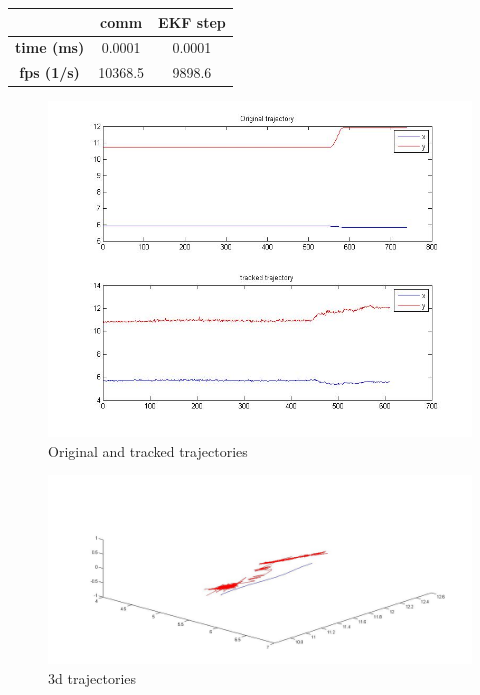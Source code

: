 		{
		\centering
			\begin{tabular}{|c|c|c|}
			\hline  					&  comm		&  EKF step	\\
			\hline  \textbf{time (ms)}	& 	0.0001	& 	0.0001	\\
			\hline  \textbf{fps (1/s)}	&  	10368.5	&   9898.6 	\\
			\hline 
			\end{tabular} 
		}
		\newline
	\begin{figure}[ph]
		\centering
		\includegraphics[width=0.7\linewidth]{../Images/c4/arch_trajs_stero}
		\caption{Original and tracked trajectories}
		\label{fig:arch_trajs_stero}
	\end{figure}
	
	\begin{figure}[ph]
		\centering
		\includegraphics[width=0.6\linewidth]{../Images/c4/arch_3d_trajs_stero}
		\caption{3d trajectories}
		\label{fig:arch_3d_trajs_stero}
	\end{figure}
